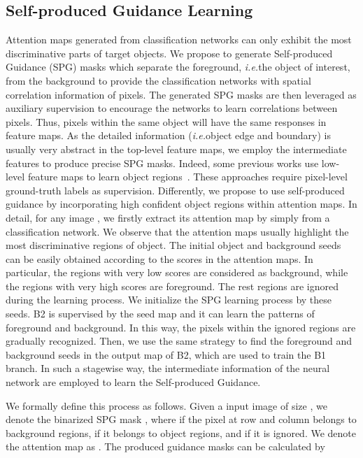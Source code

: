 \documentclass[runningheads]{llncs}
\newcommand{\ie}{\emph{i.e.}}
\begin{document}
\subsection{Self-produced Guidance Learning}
Attention maps generated from classification networks can only exhibit the most discriminative parts of target objects.
We propose to generate Self-produced Guidance (SPG) masks which separate the foreground, \ie the object of interest, from the background to provide the classification networks with spatial correlation information of pixels.
The generated SPG masks are then leveraged as auxiliary supervision to encourage the networks to learn correlations between pixels.
Thus, pixels within the same object will have the same responses in feature maps.
As the detailed information (\ie object edge and boundary) is usually very abstract in the top-level feature maps,
we employ the intermediate features to produce precise SPG masks.
Indeed, some previous works use low-level feature maps to learn object regions~\cite{xie2015holistically,hou2017deeply}.
These approaches require pixel-level ground-truth labels as supervision.
Differently, we propose to use self-produced guidance by incorporating high confident object regions within attention maps.
In detail, for any image , we firstly extract its attention map  by simply from a classification network.
We observe that the attention maps usually highlight the most discriminative regions of object.
The initial object and background seeds can be easily obtained according to the scores in the attention maps.
In particular, the regions with very low scores are considered as background, while the regions with very high scores are foreground.
The rest regions are ignored during the learning process.
We initialize the SPG learning process by these seeds.
B2 is supervised by the seed map and it can learn the patterns of foreground and background.
In this way, the pixels within the ignored regions are gradually recognized.
Then, we use the same strategy to find the foreground and background seeds in the output map of B2, which are used to train the B1 branch.
In such a stagewise way, the intermediate information of the neural network are employed to learn the Self-produced Guidance.

We formally define this process as follows. Given a input image of size , we denote the binarized SPG mask ,
where  if the pixel at  row and  column belongs to background regions,  if it belongs to object regions, and  if it is ignored.
We denote the attention map as .
The produced guidance masks can be calculated by
\end{document}
